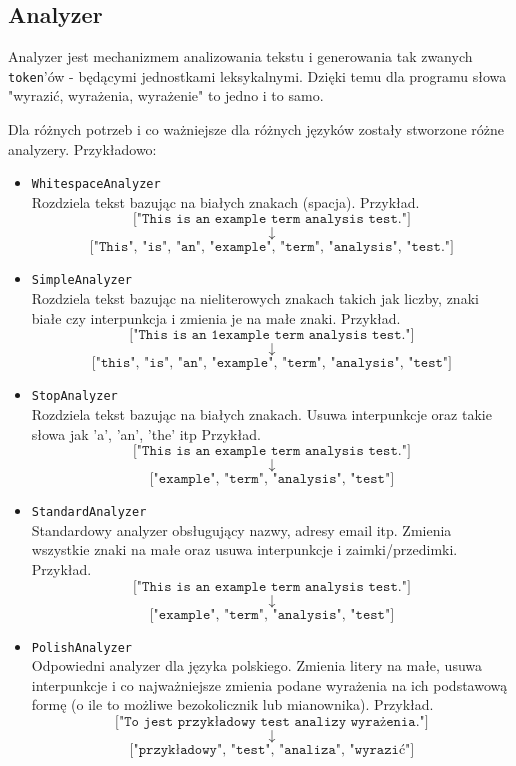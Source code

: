 \documentclass[licencjacka]{pracadypl}
\theoremstyle{definition}
\begin{document}
\subsection{Analyzer}

Analyzer jest mechanizmem analizowania tekstu i generowania tak zwanych \texttt{token}'ów - będącymi jednostkami leksykalnymi. Dzięki temu dla programu słowa "wyrazić, wyrażenia, wyrażenie" to jedno i to samo.

Dla różnych potrzeb i co ważniejsze dla różnych języków zostały stworzone różne analyzery. Przykładowo:
\begin{itemize}
		\item \texttt{WhitespaceAnalyzer}\\
	Rozdziela tekst bazując na białych znakach (spacja).
	Przykład.
	$$	\texttt{["This is an example term analysis test."]}$$
	$$\downarrow$$
	$$\texttt{["This", "is", "an", "example", "term", "analysis", "test."]}$$
		
	\item \texttt{SimpleAnalyzer}\\
	Rozdziela tekst bazując na nieliterowych znakach takich jak liczby, znaki białe czy interpunkcja i zmienia je na małe znaki.
	Przykład.
	$$	\texttt{["This is an 1example term analysis test."]}$$
	$$\downarrow$$
	$$\texttt{["this", "is", "an", "example", "term", "analysis", "test"]}$$
	
	\item \texttt{StopAnalyzer}\\
	Rozdziela tekst bazując na białych znakach. Usuwa interpunkcje oraz takie słowa jak 'a', 'an', 'the' itp
	Przykład.
	$$	\texttt{["This is an example term analysis test."]}$$
	$$\downarrow$$
	$$\texttt{["example", "term", "analysis", "test"]}$$
	
	\item \texttt{StandardAnalyzer}\\
	Standardowy analyzer obsługujący nazwy, adresy email itp. 
	Zmienia wszystkie znaki na małe oraz usuwa interpunkcje i zaimki/przedimki.
	Przykład.
	$$	\texttt{["This is an example term analysis test."]}$$
	$$\downarrow$$
	$$\texttt{["example", "term", "analysis", "test"]}$$


	\item \texttt{PolishAnalyzer}\\
	Odpowiedni analyzer dla języka polskiego. Zmienia litery na małe, usuwa interpunkcje i co najważniejsze zmienia podane wyrażenia na ich podstawową formę (o ile to możliwe bezokolicznik lub mianownika).
	Przykład.
	$$	\texttt{["To jest przykładowy test analizy wyrażenia."]}$$
	$$\downarrow$$
	$$\texttt{["przykładowy", "test", "analiza", "wyrazić"]}$$
	
\end{itemize}
\end{document}
